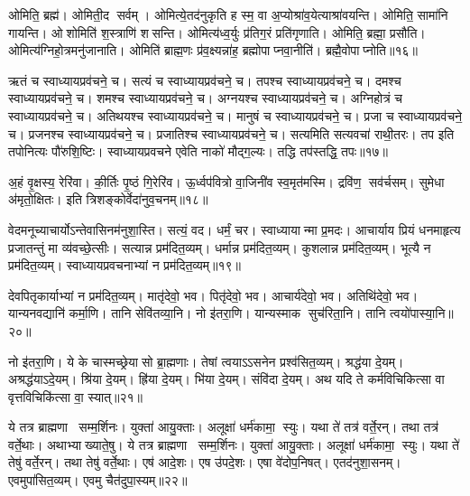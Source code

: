 ओमिति॒ ब्रह्म॑। ओमिती॒द सर्वम्। ओमित्ये॒तद॑नुकृति ह स्म॒ वा अ॒प्योश्रा॑व॒येत्याश्रा॑वयन्ति। ओमिति॒ सामा॑नि गायन्ति। ओशोमिति॑ श॒स्त्राणि॑ शसन्ति। ओमित्य॑ध्व॒र्युः प्र॑तिग॒रं प्रति॑गृणाति। ओमिति॒ ब्रह्मा॒ प्रसौ॑ति। ओमित्य॑ग्निहो॒त्रमनु॑जानाति। ओमिति॑ ब्राह्म॒णः प्र॑व॒क्ष्यन्ना॑ह॒ ब्रह्मोपाप्नवा॒नीति॑। ब्रह्मै॒वो\-पाप्नोति॥१६॥
\anuvakamend[ओन्दश॑]

ऋतं च स्वाध्यायप्रव॑चने॒ च। सत्यं च स्वाध्यायप्रव॑चने॒ च। तपश्च स्वाध्यायप्रव॑चने॒ च। दमश्च स्वाध्यायप्रव॑चने॒ च। शमश्च स्वाध्यायप्रव॑चने॒ च। अग्नयश्च स्वाध्यायप्रव॑चने॒ च। अग्निहोत्रं च स्वाध्यायप्रव॑चने॒ च। अतिथयश्च स्वाध्यायप्रव॑चने॒ च। मानुषं च स्वाध्यायप्रव॑चने॒ च। प्रजा च स्वाध्यायप्रव॑चने॒ च। प्रजनश्च स्वाध्यायप्रव॑चने॒ च। प्रजातिश्च स्वाध्यायप्रव॑चने॒ च। सत्यमिति सत्यवचा॑ राथी॒तरः। तप इति तपोनित्यः पौ॑रुशि॒ष्टिः। स्वाध्यायप्रवचने एवेति नाको॑ मौद्ग॒ल्यः। तद्धि तप॑स्तद्धि॒ तपः॥१७॥
\anuvakamend[प्रजा च स्वाध्यायप्रव॑चने॒ च षट्च॑]

अ॒हं वृ॒क्षस्य॒ रेरि॑वा। की॒र्तिः पृ॒ष्ठं गि॒रेरि॑व। ऊ॒र्ध्वप॑वित्रो वा॒जिनी॑व स्व॒मृत॑मस्मि। द्रवि॑ण॒ सव॑र्चसम्। सुमेधा अ॑मृतो॒क्षितः। इति त्रिशङ्कोर्वेदा॑नुव॒चनम्॥१८॥
\anuvakamend[अ॒ह षट्]

वेदमनूच्याचार्योऽन्तेवासिनम॑नुशा॒स्ति। सत्यं॒ वद। धर्मं॒ चर। स्वाध्यायान्मा प्र॒मदः। आचार्याय प्रियं धनमाहृत्य प्रजातन्तुं मा व्य॑वच्छे॒त्सीः। सत्यान्न प्रम॑दित॒व्यम्। धर्मान्न प्रम॑दित॒व्यम्। कुशलान्न प्रम॑दित॒व्यम्। भूत्यै न प्रम॑दित॒व्यम्। स्वाध्यायप्रवचनाभ्यां न प्रम॑दित॒व्यम्॥१९॥

देवपितृकार्याभ्यां न प्रम॑दित॒व्यम्। मातृ॑देवो॒ भव। पितृ॑देवो॒ भव। आचार्य॑देवो॒ भव। अतिथि॑देवो॒ भव। यान्यनवद्यानि॑ कर्मा॒णि। तानि सेवि॑तव्या॒नि। नो इ॑तरा॒णि। यान्यस्माक सुच॑रिता॒नि। तानि त्वयो॑पास्या॒नि॥२०॥

नो इ॑तरा॒णि। ये के चास्मच्छ्रेयासो ब्रा॒ह्मणाः। तेषां त्वयाऽऽसनेन प्रश्व॑सित॒व्यम्। श्रद्ध॑या दे॒यम्। अश्रद्ध॑याऽदे॒यम्। श्रि॑या दे॒यम्। ह्रि॑या दे॒यम्। भि॑या दे॒यम्। संवि॑दा दे॒यम्। अथ यदि ते कर्मविचिकित्सा वा वृत्तविचिकि॑त्सा वा॒ स्यात्॥२१॥

ये तत्र ब्राह्मणा सम्म॒र्\mbox{}शिनः। युक्ता॑ आयु॒क्ताः। अलूक्षा॑ धर्म॑कामा॒ स्युः। यथा ते॑ तत्र॑ वर्ते॒रन्। तथा तत्र॑ वर्ते॒थाः। अथाभ्याख्याते॒षु। ये तत्र ब्राह्मणा सम्म॒र्\mbox{}शिनः। युक्ता॑ आयु॒क्ताः। अलूक्षा॑ धर्म॑कामा॒ स्युः। यथा ते॑ तेषु॑ वर्ते॒रन्। तथा तेषु॑ वर्ते॒थाः। एष॑ आदे॒शः। एष उ॑पदे॒शः। एषा वे॑दोप॒निषत्। एतद॑नुशा॒सनम्। एवमुपा॑सित॒व्यम्। एवमु चैत॑दुपा॒स्यम्॥२२॥
\anuvakamend[स्वाध्यायप्रवचनाभ्यान्न प्रम॑दित॒व्यं तानि त्वयो॑पास्या॒नि स्यात्तेषु॑ वर्ते॒रन्त्स॒प्त च॑]

